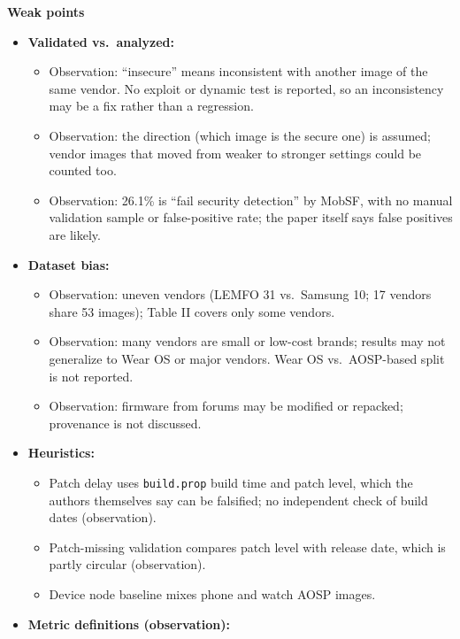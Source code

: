 \documentclass[11pt,a4paper]{article}
\begin{document}
\begin{enumerate}
    \vspace{4pt}
    \textbf{Weak points}
    \begin{itemize}[leftmargin=*,itemsep=1pt,topsep=2pt]
        \item \textbf{Validated vs.\ analyzed:}
        \begin{itemize}[itemsep=0pt]
            \item Observation: ``insecure'' means inconsistent with another image of the same vendor. No exploit or dynamic test is reported, so an inconsistency may be a fix rather than a regression.
            \item Observation: the direction (which image is the secure one) is assumed; vendor images that moved from weaker to stronger settings could be counted too.
            \item Observation: 26.1\% is ``fail security detection'' by MobSF, with no manual validation sample or false-positive rate; the paper itself says false positives are likely.
        \end{itemize}
        \item \textbf{Dataset bias:}
        \begin{itemize}[itemsep=0pt]
            \item Observation: uneven vendors (LEMFO 31 vs.\ Samsung 10; 17 vendors share 53 images); Table II covers only some vendors.
            \item Observation: many vendors are small or low-cost brands; results may not generalize to Wear OS or major vendors. Wear OS vs.\ AOSP-based split is not reported.
            \item Observation: firmware from forums may be modified or repacked; provenance is not discussed.
        \end{itemize}
        \item \textbf{Heuristics:}
        \begin{itemize}[itemsep=0pt]
            \item Patch delay uses \texttt{build.prop} build time and patch level, which the authors themselves say can be falsified; no independent check of build dates (observation).
            \item Patch-missing validation compares patch level with release date, which is partly circular (observation).
            \item Device node baseline mixes phone and watch AOSP images.
        \end{itemize}
        \item \textbf{Metric definitions (observation):}

\end{itemize}
\end{enumerate}
\end{document}
